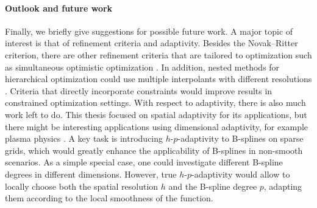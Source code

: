 \paragraph{Outlook and future work}

Finally, we briefly give suggestions for possible future work.
A major topic of interest is that of refinement criteria and adaptivity.
Besides the Novak--Ritter criterion,
there are other refinement criteria that are tailored to optimization
such as simultaneous optimistic optimization \cite{Wang14Bayesian}.
In addition, nested methods for hierarchical optimization could
use multiple interpolants with different resolutions \cite{Delbos14Global}.
Criteria that directly incorporate constraints would improve
results in constrained optimization settings.
With respect to adaptivity,
there is also much work left to do.
This thesis focused on spatial adaptivity for its applications,
but there might be interesting applications using dimensional adaptivity,
for example plasma physics \cite{Pflueger14EXAHD}.
A key task is introducing $h$-$p$-adaptivity to B-splines on sparse grids,
which would greatly enhance the applicability of B-splines in
non-smooth scenarios.
As a simple special case,
one could investigate different B-spline degrees in different dimensions.
However, true $h$-$p$-adaptivity would allow to locally choose
both the spatial resolution $h$ and the B-spline degree $p$,
adapting them according to the local smoothness of the function.

\pagebreak

